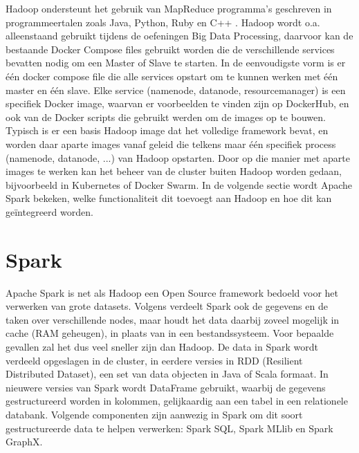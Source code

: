 Hadoop ondersteunt het gebruik van MapReduce programma's geschreven in programmeertalen zoals Java, Python, Ruby en C++ 
\autocite{Taylor2023}.
\newline
\newline
Hadoop wordt o.a. alleenstaand gebruikt tijdens de oefeningen Big Data Processing, daarvoor kan de bestaande Docker Compose files gebruikt worden die de verschillende services bevatten nodig om een Master of Slave te starten.
In de eenvoudigste vorm is er \'e\'en docker compose file die alle services opstart om te kunnen werken met \'e\'en master en \'e\'en slave.
\newline
\newline
Elke service (namenode, datanode, resourcemanager) is een specifiek Docker image, waarvan er voorbeelden te vinden zijn op DockerHub, en ook van de Docker scripts die gebruikt werden om de images op te bouwen. Typisch is er een basis Hadoop image dat het volledige framework bevat, en worden daar aparte images vanaf geleid die telkens maar \'e\'en specifiek process (namenode, datanode, ...) van Hadoop opstarten.
\newline
Door op die manier met aparte images te werken kan het beheer van de cluster buiten Hadoop worden gedaan, bijvoorbeeld in Kubernetes of Docker Swarm.
\newline
\newline
In de volgende sectie wordt Apache Spark bekeken, welke functionaliteit dit toevoegt aan Hadoop en hoe dit kan geïntegreerd worden.
\newline
\newline

\section{Spark}
Apache Spark is net als Hadoop een Open Source framework bedoeld voor het verwerken van grote datasets. Volgens \textcite{AwsAmazon2023a} verdeelt Spark ook de gegevens en de taken over verschillende nodes, maar houdt het data daarbij zoveel mogelijk in cache (RAM geheugen), in plaats van in een bestandssysteem. Voor bepaalde gevallen zal het dus veel sneller zijn dan Hadoop.
\newline
\newline
De data in Spark wordt verdeeld opgeslagen in de cluster, in eerdere versies in RDD (Resilient Distributed Dataset), een set van data objecten in Java of Scala formaat. In nieuwere versies van Spark wordt DataFrame gebruikt, waarbij de gegevens gestructureerd worden in kolommen, gelijkaardig aan een tabel in een relationele databank. Volgende componenten zijn aanwezig in Spark om dit soort gestructureerde data te helpen verwerken: Spark SQL, Spark MLlib en Spark GraphX.
\autocite{DataFlair2023}

